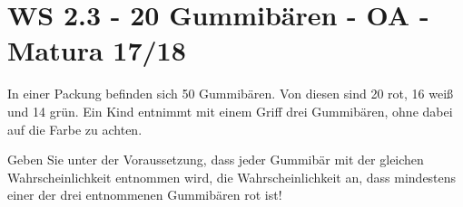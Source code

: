 \section{WS 2.3 - 20 Gummibären - OA - Matura 17/18}

\begin{beispiel}[WS 2.3]{1} %
In einer Packung befinden sich 50 Gummibären. Von diesen sind 20 rot, 16 weiß und 14 grün. Ein Kind entnimmt mit einem Griff drei Gummibären, ohne dabei auf die Farbe zu achten.

Geben Sie unter der Voraussetzung, dass jeder Gummibär mit der gleichen Wahrscheinlichkeit entnommen wird, die Wahrscheinlichkeit an, dass mindestens einer der drei entnommenen Gummibären rot ist!

\end{beispiel}